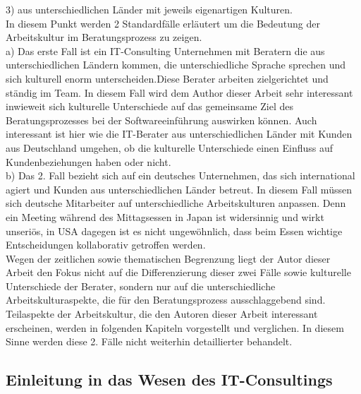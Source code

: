 3) aus unterschiedlichen Länder mit jeweils eigenartigen Kulturen.\\
 In diesem Punkt werden 2 Standardfälle erläutert um die Bedeutung der Arbeitskultur im Beratungsprozess zu zeigen.\\
 a) Das erste Fall ist ein IT-Consulting Unternehmen mit Beratern die aus unterschiedlichen Ländern kommen, die unterschiedliche Sprache sprechen und sich kulturell enorm unterscheiden.Diese Berater arbeiten zielgerichtet und ständig im Team. In diesem Fall wird dem Author dieser Arbeit sehr interessant inwieweit sich kulturelle Unterschiede auf das gemeinsame Ziel des Beratungsprozesses bei der Softwareeinführung auswirken können. Auch interessant ist hier wie die IT-Berater aus unterschiedlichen Länder mit Kunden aus Deutschland umgehen, ob die kulturelle Unterschiede einen Einfluss auf Kundenbeziehungen haben oder nicht. \\
 b) Das 2. Fall bezieht sich auf ein deutsches Unternehmen, das sich international agiert und Kunden aus unterschiedlichen Länder betreut. In diesem Fall müssen sich deutsche Mitarbeiter auf unterschiedliche Arbeitskulturen anpassen. Denn ein Meeting während des Mittagsessen in Japan ist widersinnig und wirkt unseriös, in USA dagegen ist es nicht ungewöhnlich, dass beim Essen wichtige Entscheidungen kollaborativ getroffen werden.  \\
Wegen der zeitlichen sowie thematischen Begrenzung liegt der Autor dieser Arbeit den Fokus nicht auf die Differenzierung dieser zwei Fälle sowie kulturelle Unterschiede der Berater, sondern nur auf die unterschiedliche Arbeitskulturaspekte, die für den Beratungsprozess ausschlaggebend sind. Teilaspekte der Arbeitskultur, die den Autoren dieser Arbeit interessant erscheinen, werden in folgenden Kapiteln vorgestellt und verglichen. In diesem Sinne werden diese 2. Fälle nicht weiterhin detaillierter behandelt.

\subsection{Einleitung in das Wesen des IT-Consultings}	

